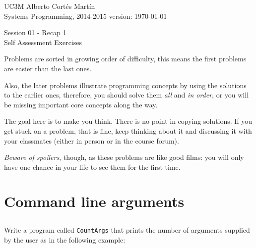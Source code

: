 \documentclass[a4paper, 12pt]{article}
\newcommand{\realtitle}{Session 01 - Recap 1}
\begin{document}
\makebox[\linewidth]{\rule{\textwidth}{0.4pt}}
UC3M \hfill Alberto Cortés Martín\\
Systems Programming, 2014-2015 \hfill version: \today\\
\makebox[\linewidth]{\rule{\textwidth}{0.4pt}}
\begin{center}
  \Large{\realtitle}\\Self Assessment Exercises
\end{center}
\makebox[\linewidth]{\rule{\textwidth}{0.4pt}}
\vspace{1cm}

Problems are sorted in growing order of difficulty, this means the first
problems are easier than the last ones.

Also, the later problems illustrate programming concepts by using the solutions
to the earlier ones, therefore, you should solve them \emph{all} and \emph{in
order}, or you will be missing important core concepts along the way.

The goal here is to make you think. There is no point in copying solutions.  If
you get stuck on a problem, that is fine, keep thinking about it and discussing
it with your classmates (either in person or in the course forum).

\emph{Beware of spoilers}, though, as these problems are like good films: you
will only have one chance in your life to see them for the first time.

\section{Command line arguments}

\subsection{}

Write a program called \texttt{CountArgs} that prints the number of arguments
supplied by the user as in the following example:



\subsection{}
\end{document}
